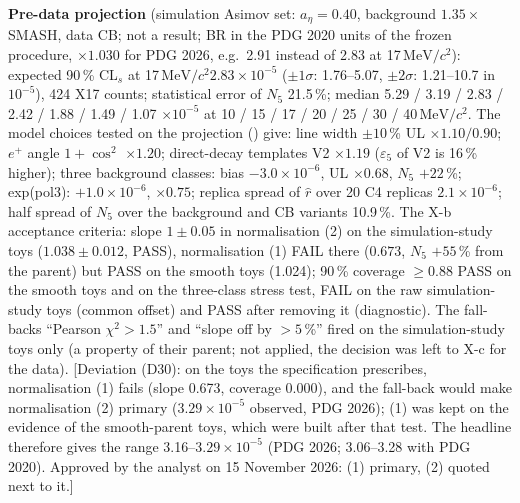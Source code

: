 \documentclass[11pt,a4paper]{article}
\newcommand{\MeVcc}{\ensuremath{\mathrm{MeV}/c^{2}}\xspace}
\newcommand{\code}[1]{\texttt{\detokenize{#1}}}
\newcommand{\aEta}{\ensuremath{a_\eta}\xspace}
\newcommand{\flag}[1]{\textcolor{red!60!black}{[#1]}}
\begin{document}
\textbf{Pre-data projection} (simulation Asimov set: $\aEta=0.40$, background $1.35\times$ SMASH, data CB; not a result; BR in the PDG 2020 units of the frozen
procedure, $\times1.030$ for PDG 2026, e.g.\ 2.91 instead of 2.83 at 17\,\MeVcc): expected 90\,\% CL$_s$ at
17\,\MeVcc $2.83\times10^{-5}$ ($\pm1\sigma$: 1.76--5.07, $\pm2\sigma$: 1.21--10.7 in $10^{-5}$), 424 X17 counts; statistical error of $N_5$ 21.5\,\%;
median 5.29 / 3.19 / 2.83 / 2.42 / 1.88 / 1.49 / 1.07 $\times10^{-5}$ at 10 / 15 / 17 / 20 / 25 / 30 / 40\,\MeVcc. The model choices tested on the
projection (\code{x17ab_nuis.txt}) give: line width $\pm10$\,\% UL $\times1.10/0.90$; $e^+$ angle $1+\cos^2$ $\times1.20$; direct-decay templates V2
$\times1.19$ ($\varepsilon_5$ of V2 is 16\,\% higher); three background classes: bias $-3.0\times10^{-6}$, UL $\times0.68$, $N_5$ $+22$\,\%; exp(pol3):
$+1.0\times10^{-6}$, $\times0.75$; replica spread of $\hat r$ over 20 C4 replicas $2.1\times10^{-6}$; half spread of $N_5$ over the background and CB
variants 10.9\,\%. The X-b acceptance criteria: slope $1\pm0.05$ in normalisation (2) on the simulation-study toys ($1.038\pm0.012$, PASS),
normalisation (1) FAIL there ($0.673$, $N_5$ $+55$\,\% from the parent) but PASS on the smooth toys (1.024); 90\,\% coverage $\ge0.88$ PASS on the
smooth toys and on the three-class stress test, FAIL on the raw simulation-study toys (common offset) and PASS after removing it (diagnostic).
The fall-backs ``Pearson $\chi^2>1.5$'' and ``slope off by $>5$\,\%'' fired on the simulation-study toys only (a property of their parent; not
applied, the decision was left to X-c for the data). \flag{Deviation (D30): on the toys the specification prescribes, normalisation (1) fails
(slope 0.673, coverage 0.000), and the fall-back would make normalisation (2) primary ($3.29\times10^{-5}$ observed, PDG 2026); (1) was kept on the
evidence of the smooth-parent toys, which were built after that test. The headline therefore gives the range 3.16--$3.29\times10^{-5}$ (PDG 2026; 3.06--3.28 with PDG 2020). Approved by the analyst on 15 November
2026: (1) primary, (2) quoted next to it.}
\end{document}
